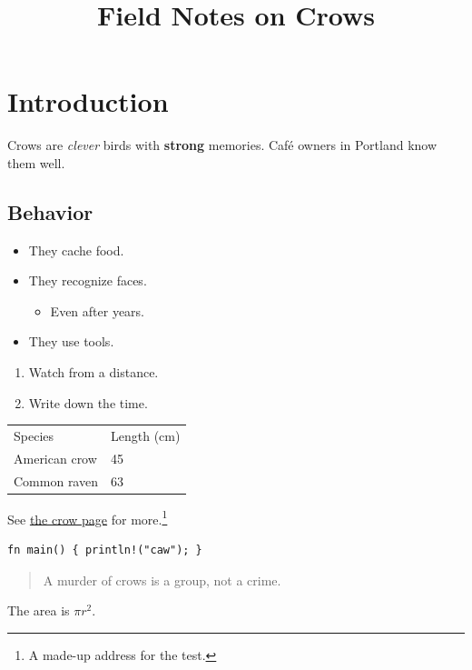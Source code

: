 \documentclass{article}
\title{Field Notes on Crows}
\begin{document}
\maketitle

\section{Introduction}
Crows are \emph{clever} birds with \textbf{strong} memories. Café owners in Portland know them well.

\subsection{Behavior}
\begin{itemize}
  \item They cache food.
  \item They recognize faces.
  \begin{itemize}
    \item Even after years.
  \end{itemize}
  \item They use tools.
\end{itemize}

\begin{enumerate}
  \item Watch from a distance.
  \item Write down the time.
\end{enumerate}

\begin{tabular}{ll}
Species & Length (cm) \tabularnewline
American crow & 45 \tabularnewline
Common raven & 63 \tabularnewline
\end{tabular}

See \href{https://example.org/crows}{the crow page} for more.\footnote{A made-up address for the test.}

\begin{verbatim}
fn main() { println!("caw"); }
\end{verbatim}

\begin{quote}
A murder of crows is a group, not a crime.
\end{quote}

The area is $\pi r^2$.
\end{document}
